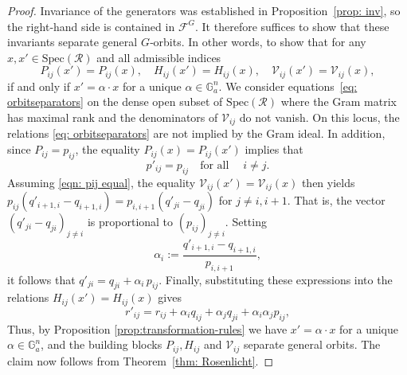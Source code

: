 \documentclass[10pt,a4paper]{amsart}
\begin{document}
\begin{proof}
Invariance of the generators was established in
Proposition~\ref{prop: inv}, so the right‑hand side is contained in
$\mathcal{F}^G$. It therefore suffices to show that these invariants separate
general $G$‑orbits. In other words, to show that for any $x,x' \in \mathrm{Spec}(\mathcal R)$ and all admissible indices
\begin{equation}\label{eq: orbitseparators}
   P_{ij}(x')=P_{ij}(x),
  \quad
  H_{ij}(x')=H_{ij}(x),
  \quad
  \mathcal{V}_{ij}(x')=\mathcal{V}_{ij}(x),  
\end{equation}
if and only if  $x'=\alpha\cdot x$ for a unique $\alpha\in \mathbb{G}_a^n$. 
We consider equations~\eqref{eq: orbitseparators} on the dense open subset of $\mathrm{Spec}(\mathcal R)$ where the Gram matrix has maximal rank and the denominators of $\mathcal V_{ij}$ do not vanish.
On this
locus, the relations \eqref{eq: orbitseparators} are not implied by the Gram ideal.
In addition, since $P_{ij}=p_{ij}$, the equality $P_{ij}(x)=P_{ij}(x')$
implies that
\begin{equation}\label{eqn: pij equal}
p'_{ij}=p_{ij} \quad \text{for all} \quad  \;  i\neq j.
\end{equation}
Assuming \eqref{eqn: pij equal}, the equality $\mathcal V_{ij}(x')=\mathcal V_{ij}(x)$ then yields
$
  p_{ij}(q'_{i+1,i}-q_{i+1,i})
  =
  p_{i,i+1}(q'_{ji}-q_{ji})
$ for $j\neq i,i+1$.
That is, the vector
$(q'_{ji}-q_{ji})_{j\neq i}$ is proportional to $(p_{ij})_{j\neq i}$. Setting
\begin{equation*}\label{eq:alphai}
  \alpha_i := \frac{q'_{i+1, i}-q_{i+1, i}}{p_{i,i+1}},
\end{equation*}
it follows that
$
 q'_{ji}=q_{ji}+\alpha_i\,p_{ij}
$. Finally, substituting these expressions into the relations
$H_{ij}(x')=H_{ij}(x)$ gives
$$
  r'_{ij}
  =
  r_{ij}
  + \alpha_i q_{ij}
  + \alpha_j q_{ji}
  + \alpha_i\alpha_j p_{ij},
$$
Thus, by Proposition \ref{prop:transformation-rules} we have $x'=\alpha\cdot x$ for a unique $\alpha\in\mathbb G_a^n$, and the building blocks $P_{ij}, H_{ij}$ and $\mathcal{V}_{ij}$ separate general orbits. The claim now follows from Theorem~\ref{thm: Rosenlicht}.
\end{proof}
\end{document}
